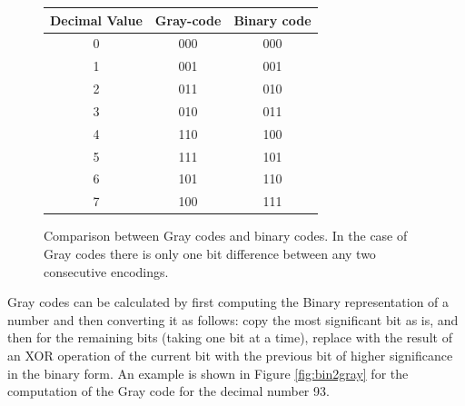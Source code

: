 \documentclass[final,12pt,3p]{elsarticle}
\begin{document}
\begin{figure}[!ht]
\centering
\begin{tabular}[b]{ | c | c | c |}
				   \hline 
				    Decimal Value & Gray-code & Binary code\\
				    \hline                       
 0 &  000  &  000\\
 \hline
 1 &  001  &  001\\
  \hline
 2 &  011  &  010\\
  \hline
 3 &  010  &  011\\
  \hline
 4 &  110  &  100\\
  \hline
 5 &  111  &  101\\
  \hline
 6 &  101  &  110\\
  \hline
 7 &  100  &  111\\
				   \hline  
				 \end{tabular}
				 \caption{\label{tab:gray_code} Comparison between Gray codes and binary codes. In the case of Gray codes there is only one bit difference between any two consecutive encodings.}
\end{figure}

Gray codes can be calculated by first computing the Binary representation of a number and then converting it as follows: copy the most significant bit as is, and then for the remaining bits (taking one bit at a time), replace with the result of an XOR operation of the current bit with the previous bit of higher significance in the binary form. An example is shown in Figure \ref{fig:bin2gray} for the computation of the Gray code for the decimal number 93. 
\end{document}
